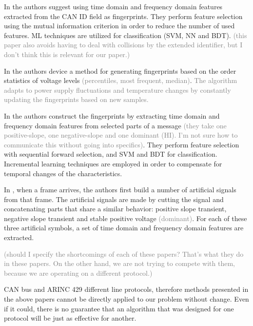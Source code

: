 \documentclass[conference]{IEEEtran}
\begin{document}
  In \cite{choi2018identifying} the authors suggest using time domain and frequency domain features extracted from the CAN ID field as fingerprints. They perform feature selection using the mutual information criterion in order to reduce the number of used features. ML techniques are utilized for classification (SVM, NN and BDT). \textcolor{gray}{(this paper also avoids having to deal with collisions by the extended identifier, but I don't think this is relevant for our paper.)}
  
  In \cite{cho2017viden} the authors device a method for generating fingerprints based on the order statistics of voltage levels \textcolor{gray}{(percentiles, most frequent, median)}. \textcolor{gray}{The algorithm adapts to power supply fluctuations and temperature changes by constantly updating the fingerprints based on new samples.}
  
  In \cite{choi2018voltageids} the authors construct the fingerprints by extracting time domain and frequency domain features from selected parts of a message \textcolor{gray}{(they take one positive-slope, one negative-slope and one dominant (HI). I'm not sure how to communicate this without going into specifics)}. They perform feature selection with sequential forward selection, and SVM and BDT for classification. Incremental learning techniques \cite{diehl2003svm} are employed in order to compensate for temporal changes of the characteristics.
  
  In \cite{kneib2018scission}, when a frame arrives, the authors first build a number of artificial signals from that frame. The artificial signals are made by cutting the signal and concatenating parts that share a similar behavior: positive slope transient, negative slope transient and stable positive voltage \textcolor{gray}{(dominant)}. For each of these three artificial symbols, a set of time domain and frequency domain features are extracted.
  
  \textcolor{gray}{(should I specify the shortcomings of each of these papers? That's what they do in these papers. On the other hand, we are not trying to compete with them, because we are operating on a different protocol.)}
  
  CAN bus and ARINC 429 different line protocols, therefore methods presented in the above papers cannot be directly applied to our problem without change. Even if it could, there is no guarantee that an algorithm that was designed for one protocol will be just as effective for another.
  
\end{document}
